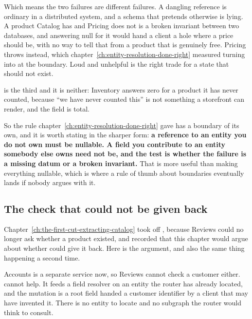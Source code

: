 Which means the two failures are different failures. A dangling reference is
ordinary in a distributed system, and a schema that pretends otherwise is
lying. A product Catalog has and Pricing does not is a broken invariant between
two databases, and answering null for it would hand a client a hole where a
price should be, with no way to tell that from a product that is genuinely
free. Pricing throws instead, which
chapter~\ref{ch:entity-resolution-done-right} measured turning into
 at the boundary. Loud and unhelpful is the
right trade for a state that should not exist.

 is the third and it is neither: Inventory
answers zero for a product it has never counted, because \enquote{we have never
counted this} is not something a storefront can render, and the field is total.

%
So the rule chapter~\ref{ch:entity-resolution-done-right} gave has a boundary of
its own, and it is worth stating
in the sharper form: \textbf{a reference to an entity you do not own must be
nullable. A field you contribute to an entity somebody else owns need not be,
and the test is whether the failure is a missing datum or a broken invariant.}
That is more useful than making everything nullable, which is where a rule of
thumb about boundaries eventually lands if nobody argues with it.

\subsection*{The check that could not be given back}

%
Chapter~\ref{ch:the-first-cut-extracting-catalog} took
 off , because Reviews could no
longer ask whether a product existed, and recorded that this chapter would argue
about whether  could give it back. Here is the argument, and
also the same thing happening a second time.

Accounts is a separate service now, so Reviews cannot check a customer either.
 cannot help. It feeds a field resolver on an entity the router
has already located, and the mutation is a root field handed a customer
identifier by a client that may have invented it. There is no entity to locate
and no subgraph the router would think to consult.

